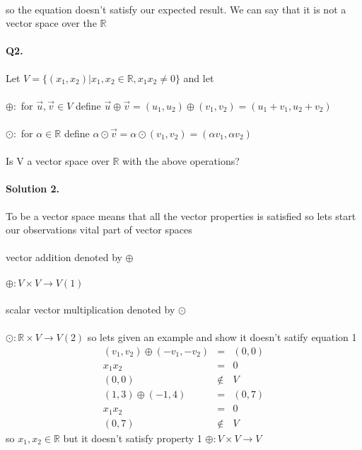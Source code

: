\documentclass[11pt]{article}
\newcommand{\R}{\mathbb{R}}
\begin{document}
\paragraph{}so the equation doesn't satisfy our expected result. We can say that it is not a vector space over the $\R$


\paragraph{Q2.}Let $V=\{ (x_1,x_2) | x_1,x_2 \in \R, x_1x_2 \neq 0 \}$ and let 
\paragraph{}$\oplus:$ for $\vec{u},\vec{v} \in V$ define 
$
\vec{u} \oplus \vec{v}=(u_1,u_2) \oplus (v_1,v_2)=(u_1+v_1,u_2+v_2)
$
\paragraph{}$\odot:$ for $\alpha \in \R$ define 
$
\alpha \odot \vec{v}=\alpha \odot (v_1,v_2)=(\alpha v_1,\alpha v_2)
$
\\
\\
Is V a vector space over $\R$ with the above operations?

\paragraph{Solution 2.}To be a vector space means that all the vector properties is satisfied so lets start our observations vital part of vector spaces
\\
\\
vector addition denoted by $\oplus$
\paragraph{}$\oplus : V \times V \rightarrow V (1)$
\\
\\
scalar vector multiplication denoted by $\odot$
\paragraph{}$\odot : \R \times V \rightarrow V (2)$
so lets given an example and show it doesn't satify equation 1
\begin{eqnarray*}
(v_1,v_2) \oplus (-v_1,-v_2) &=& (0,0) 
\\x_1 x_2 &=& 0
\\(0,0) &\notin & V
\\(1,3) \oplus  (-1,4) & = &(0,7)
\\x_1 x_2 &=& 0
\\(0,7) & \notin & V
\end{eqnarray*}
so $x_1,x_2 \in \R$ but it doesn't satisfy property 1 $\oplus : V \times V \rightarrow V$
\end{document}
